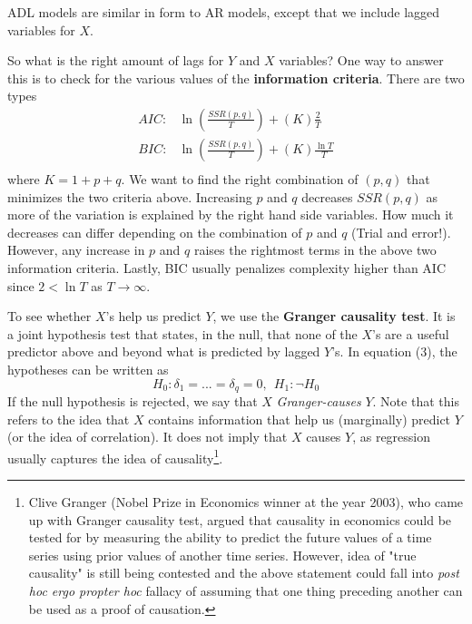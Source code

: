 ADL models are similar in form to AR models, except that we include lagged variables for $X$.
\par\medskip
So what is the right amount of lags for $Y$ and $X$ variables? One way to answer this is to check for the various values of the \textbf{information criteria}. There are two types
\[
\begin{aligned}
AIC:& \ln\left(\frac{SSR(p,q)}{T}\right)+(K)\frac{2}{T}\\
BIC:& \ln\left(\frac{SSR(p,q)}{T}\right)+(K)\frac{\ln{T}}{T}\\
\end{aligned}
\]
where $K=1+p+q$. We want to find the right combination of $(p,q)$ that minimizes the two criteria above. Increasing $p$ and $q$ decreases $SSR(p,q)$ as more of the variation is explained by the right hand side variables. How much it decreases can differ depending on the combination of $p$ and $q$ (Trial and error!). However, any increase in $p$ and $q$ raises the rightmost terms in the above two information criteria. Lastly, BIC usually penalizes complexity higher than AIC since $2<\ln{T}$ as $T\to\infty$. 
\par\medskip
To see whether $X$'s help us predict $Y$, we use the \textbf{Granger causality test}. It is a joint hypothesis test that states, in the null, that none of the $X$'s are a useful predictor above and beyond what is predicted by lagged $Y$'s. In equation (3), the hypotheses can be written as
\[
H_0: \delta_1 = ... = \delta_q=0, \ \ H_1: \lnot H_0
\]
If the null hypothesis is rejected, we say that $X$ \textit{Granger-causes} $Y$. Note that this refers to the idea that $X$ contains information that help us (marginally) predict $Y$ (or the idea of correlation). It does not imply that $X$ causes $Y$, as regression usually captures the idea of causality\footnote{Clive Granger (Nobel Prize in Economics winner at the year 2003), who came up with Granger causality test, argued that causality in economics could be tested for by measuring the ability to predict the future values of a time series using prior values of another time series. However, idea of "true causality" is still being contested and the above statement could fall into  \textit{post hoc ergo propter hoc} fallacy of assuming that one thing preceding another can be used as a proof of causation.  }. 


